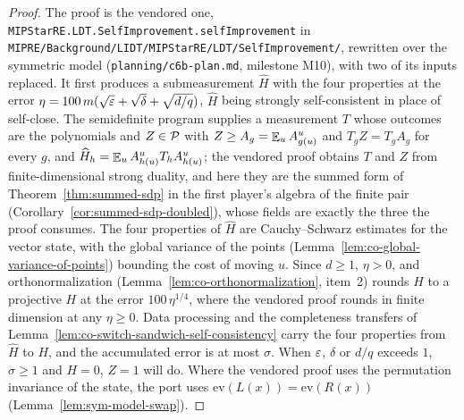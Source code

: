 \begin{proof}
\leanok
The proof is the vendored one, \texttt{MIPStarRE.LDT.SelfImprovement.selfImprovement} in
\texttt{MIPRE/Background/LIDT/MIPStarRE/LDT/SelfImprovement/}, rewritten over the symmetric model
(\texttt{planning/c6b-plan.md}, milestone M10), with two of its inputs replaced. It first
produces a submeasurement $\widehat{H}$ with the four properties at the error $\eta = 100\, m
(\sqrt{\eps} + \sqrt{\delta} + \sqrt{d/q})$, $\widehat{H}$ being strongly self-consistent in place of
self-close. The semidefinite program supplies a measurement $T$ whose outcomes are the polynomials
and $Z \in \cal{P}$ with $Z \geq A_g = \E_u A^u_{g(u)}$ and $T_g Z = T_g A_g$ for every $g$, and
$\widehat{H}_h = \E_u A^u_{h(u)} T_h A^u_{h(u)}$; the vendored proof obtains $T$ and $Z$ from
finite-dimensional strong duality, and here they are the summed form of
Theorem~\ref{thm:summed-sdp} in the first player's algebra of the finite pair
(Corollary~\ref{cor:summed-sdp-doubled}), whose fields are exactly the three the proof consumes.
The four properties of $\widehat{H}$ are Cauchy--Schwarz estimates for the vector state, with the
global variance of the points (Lemma~\ref{lem:co-global-variance-of-points}) bounding the cost of
moving $u$. Since $d \geq 1$, $\eta > 0$, and orthonormalization
(Lemma~\ref{lem:co-orthonormalization}, item~2) rounds $\widehat{H}$ to a projective $H$ at the
error $100\, \eta^{1/4}$, where the vendored proof rounds in finite dimension at any $\eta \geq
0$. Data processing and the completeness transfers of
Lemma~\ref{lem:co-switch-sandwich-self-consistency} carry the four properties from $\widehat{H}$ to
$H$, and the accumulated error is at most $\sigma$. When $\eps$, $\delta$ or $d/q$ exceeds $1$,
$\sigma \geq 1$ and $H = 0$, $Z = 1$ will do. Where the vendored proof uses the permutation
invariance of the state, the port uses $\mathrm{ev}(L(x)) = \mathrm{ev}(R(x))$
(Lemma~\ref{lem:sym-model-swap}).
\end{proof}

